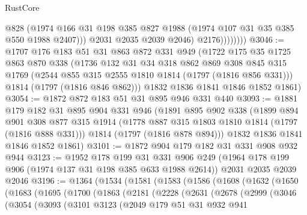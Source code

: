 \begin{lexlean}{RustCore}
\begin{coremodule}
                        @828
                        (@1974
                          @166
                          @31
                          @198
                          @385
                          @827
                          @1988
                          (@1974 @107 @31 @35 @385 @550 @1988 @2407)))
                      @2031
                      @2035
                      @2039
                      @2046)
                    @2176))))))))
@3046 := @1707
    @176
    @183
    @51
    @31
    @863
    @872
    @331
    @949
    (@1722
      @175
      @35
      @1725
      @863
      @870
      @338
      (@1736
        @132
        @31
        @34
        @318
        @862
        @869
        @308
        @845
        @315
        @1769
        (@2544 @855 @315 @2555 @1810 @1814 (@1797 (@1816 @856 @331)))
        @1814
        (@1797 (@1816 @846 @862)))
      @1832
      @1836
      @1841
      @1846
      @1852
      @1861)
@3054 := @1872 @872 @183 @51 @31 @895 @946 @331 @440
@3093 := @1881
    @179
    @182
    @31
    @895
    @904
    @331
    @946
    (@1891
      @895
      @902
      @338
      (@1899
        @894
        @901
        @308
        @877
        @315
        @1914
        (@1778 @887 @315 @1803 @1810 @1814 (@1797 (@1816 @888 @331)))
        @1814
        (@1797 (@1816 @878 @894)))
      @1832
      @1836
      @1841
      @1846
      @1852
      @1861)
@3101 := @1872 @904 @179 @182 @31 @331 @908 @932 @944
@3123 := @1952
    @178
    @199
    @31
    @331
    @906
    @249
    (@1964 @178 @199 @906 (@1974 @137 @31 @198 @385 @633 @1988 @2614))
    @2031
    @2035
    @2039
    @2046
@3196 := @1364
    (@1534
      (@1581
        (@1583
          (@1586
            (@1608
              (@1632
                (@1650
                  (@1683
                    (@1695
                      (@1700
                        (@1863
                          (@2181
                            (@2228
                              (@2631
                                (@2678
                                  (@2999
                                    (@3046
                                      (@3054
                                        (@3093
                                          (@3101
                                            @3123
                                            (@2049
                                              @179
                                              @51
                                              @31
                                              @932
                                              @941

\end{coremodule}
\end{lexlean}
